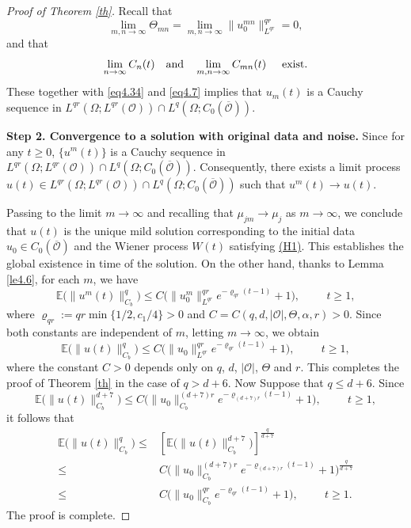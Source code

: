 \documentclass[10pt]{article}
\numberwithin{figure}{section}
\numberwithin{equation}{section}
\newcommand{\cO}{{\mathcal O}}
\newcommand{\0}{{\theta}}
\def\Hs{\hspace{1cm}}\def\hs{\hspace{0.5cm}}
\def\Vs{\vskip8pt}\def\vs{\vskip4pt}
\def\[{\left[}\def\]{\right]}
\begin{document}
\begin{proof}[Proof of Theorem \ref{th}]
Recall that $$\lim_{m,n\to\infty}\Theta_{mn}=\lim_{m,n\to\infty}\|u_0^{mn}\|_{L^{qr}}^{qr}=0,$$ and that $$\lim_{n\to\infty}C_n(t)\quad\hbox{and}\quad\lim_{m,n\to\infty}C_{mn}(t)\hs\hbox{exist}.$$ These together with \eqref{eq4.34} and \eqref{eq4.7} implies that $u_m(t)$ is a Cauchy sequence in $L^{qr}(\Omega; L^{qr}(\mathcal{O}))\cap L^q(\Omega; C_0(\overline{\mathcal{O}}))$.
\Vs

{\bf Step 2. Convergence to a solution with original data and noise.} 
Since for any $t\ge0$, $\{u^m(t)\}$ is a Cauchy sequence in $L^{qr}(\Omega; L^{qr}(\mathcal{O}))\cap L^q(\Omega; C_0(\overline{\mathcal{O}}))$. Consequently, there exists a limit process $u(t) \in L^{qr}(\Omega; L^{qr}(\mathcal{O})) \cap L^q(\Omega; C_0(\overline{\mathcal{O}}))$ such that $u^m(t) \to u(t)$.

Passing to the limit $m \to \infty$ and recalling that $\mu_{jm} \to \mu_j$ as $m \to \infty$, we conclude that $u(t)$ is the unique mild solution corresponding to the initial data $u_0\in C_0(\overline{\cO})$ and the Wiener process $W(t)$ satisfying \hyperref[H1]{(H1)}. This establishes the global existence in time of the solution.
\vs
On the other hand, thanks to Lemma \ref{le4.6}, for each $m$, we have
$$
\mathbb{E}\big(\| u^m(t) \|_{C_b}^q\big) \le C \big( \| u_0^m \|_{L^{qr}}^{qr} e^{-\varrho_{qr}(t-1)} + 1 \big), \Hs t \ge 1,
$$
where $\varrho_{qr} := qr\min\{1/2, c_1/4\} > 0$ and $C = C(q,d,|\mathcal{O}|,\Theta,\alpha,r) > 0$. Since both constants are independent of $m$, letting $m \to \infty$, we obtain
$$
\mathbb{E}\big(\| u(t) \|_{C_b}^q\big) \le C \big( \| u_0 \|_{L^{qr}}^{qr} e^{-\varrho_{qr}(t-1)} + 1 \big), \Hs t \ge 1,
$$
where the constant $C>0$  depends only on $q$, $d$, $|\mathcal{O}|$, $\Theta$ and $r$. 
This completes the proof of Theorem \ref{th} in the case of $q>d+6$.
\vs 
Now Suppose that $q\le d+6$. Since  $$\mathbb{E}\big(\| u(t) \|_{C_b}^{d+7}\big) \le C \big(\| u_0 \|_{C_b}^{(d+7)r} e^{-\varrho_{(d+7)r}(t-1)} + 1 \big), \Hs t \ge 1,$$
it follows that
$$\begin{aligned}\mathbb{E}\big(\| u(t) \|_{C_b}^q\big) \le& \[\mathbb{E}\big(\| u(t) \|_{C_b}^{d+7}\big)\]^{\frac{q}{d+7}}\\
\le&C\big( \| u_0 \|_{C_b}^{(d+7)r} e^{-\varrho_{(d+7)r}(t-1)} + 1 \big)^{\frac{q}{d+7}}\\
\le&C\big( \| u_0 \|_{C_b}^{qr} e^{-\varrho_{qr}(t-1)} + 1 \big), \Hs t \ge 1.\end{aligned}$$
The proof is complete.
\end{proof}
\end{document}
